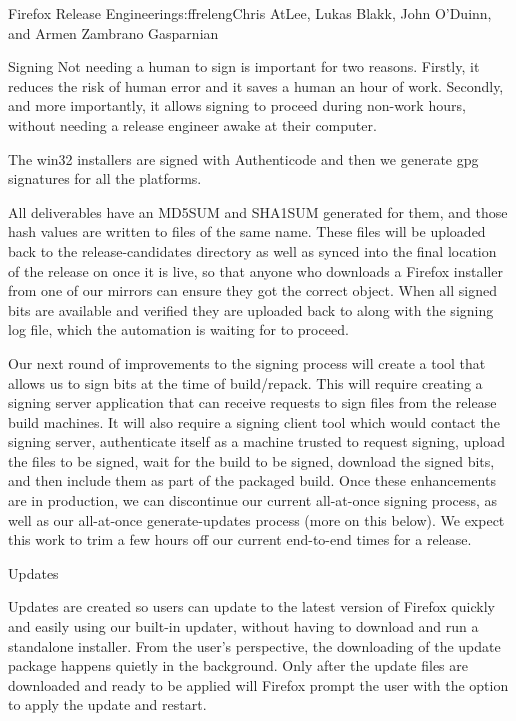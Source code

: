 \begin{aosachapter}{Firefox Release Engineering}{s:ffreleng}{Chris AtLee, Lukas Blakk, John O'Duinn, and Armen Zambrano Gasparnian}
\begin{aosasect1}{Signing}
Not needing a
human to sign is important for two reasons. Firstly, it reduces the
risk of human error and it saves a human an
hour of work. Secondly, and more importantly, it allows signing to
proceed during non-work hours, without needing a release engineer
awake at their computer.  

The win32 installers are signed
with Authenticode and then we generate gpg signatures for all the
platforms.

All deliverables have an MD5SUM and SHA1SUM generated for them, and
those hash values are written to files of the same name.  These files
will be uploaded back to the release-candidates directory as well as
synced into the final location of the release on  once
it is live, so that anyone who downloads a Firefox installer from one of our
mirrors can ensure they got the correct object. When all signed bits
are available and verified 
 they are uploaded back to  along
with the signing log file, which the automation is waiting for to
proceed.

Our next round of improvements to the signing process will create a
tool that allows us to sign bits at the time of build/repack. This
will require creating a signing server application that can receive
requests to sign files from the release build machines.  It will also
require a signing client tool which would contact the signing
server, authenticate itself as a machine trusted to request signing,
upload the files to be signed, wait for the build to be signed,
download the signed bits, and then include them as part of the
packaged build.  Once these enhancements are in production, we can
discontinue our current all-at-once signing process, as well as our
all-at-once generate-updates process (more on this below). We expect this
work to trim a few hours off our current end-to-end times for a
release.
  
\end{aosasect1}

\begin{aosasect1}{Updates}

Updates are created so users can update to the latest version of
Firefox quickly and easily using our built-in updater, without having
to download and run a standalone installer.
From the user's perspective, the downloading of the update
package happens quietly in the background. Only after the update files
are downloaded and ready to be applied will Firefox prompt the user
with the option to apply the update and restart.


\end{aosasect1}
\end{aosachapter}

